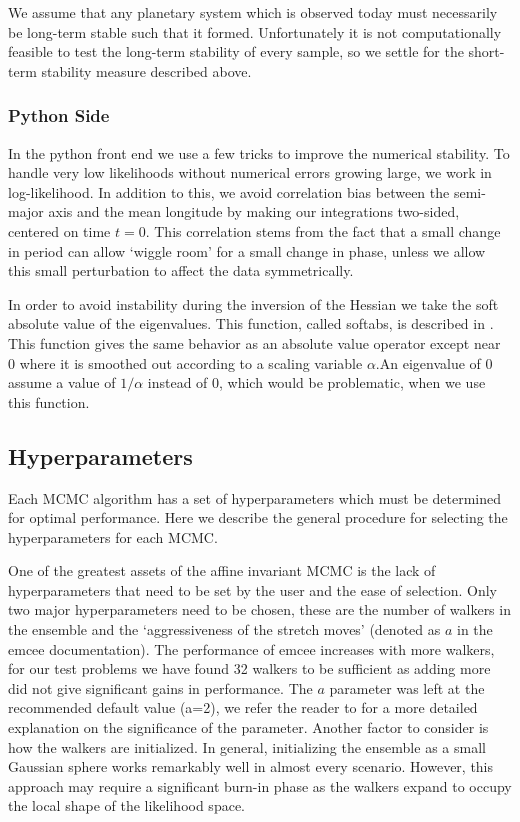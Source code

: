 \documentclass{aa}
\begin{document}
We assume that any planetary system which is observed today must necessarily be long-term stable such that it formed. Unfortunately it is not computationally feasible to test the long-term stability of every sample, so we settle for the short-term stability measure described above.

\subsubsection{Python Side}
In the python front end we use a few tricks to improve the numerical stability. To handle very low likelihoods without numerical errors growing large, we work in log-likelihood. In addition to this, we avoid correlation bias between the semi-major axis and the mean longitude by making our integrations two-sided, centered on time $t=0$. This correlation stems from the fact that a small change in period can allow `wiggle room' for a small change in phase, unless we allow this small perturbation to affect the data symmetrically.

In order to avoid instability during the inversion of the Hessian we take the soft absolute value of the eigenvalues. This function, called softabs, is described in \cite{softabs}. This function gives the same behavior as an absolute value operator except near $0$ where it is smoothed out according to a scaling variable $\alpha$.An eigenvalue of $0$ assume a value of $1/\alpha$ instead of $0$, which would be problematic, when we use this function.

\subsection{Hyperparameters}\label{hyper}
Each MCMC algorithm has a set of hyperparameters which must be determined for optimal performance. Here we describe the general procedure for selecting the hyperparameters for each MCMC.

One of the greatest assets of the affine invariant MCMC is the lack of hyperparameters that need to be set by the user and the ease of selection. Only two major hyperparameters need to be chosen, these are the number of walkers in the ensemble and the `aggressiveness of the stretch moves' (denoted as $a$ in the emcee documentation). The performance of emcee increases with more walkers, for our test problems we have found 32 walkers to be sufficient as adding more did not give significant gains in performance. The $a$ parameter was left at the recommended default value (a=2), we refer the reader to \cite{Foreman-Mackey2013} for a more detailed explanation on the significance of the parameter. Another factor to consider is how the walkers are initialized. In general, initializing the ensemble as a small Gaussian sphere works remarkably well in almost every scenario. However, this approach may require a significant burn-in phase as the walkers expand to occupy the local shape of the likelihood space.
\end{document}
